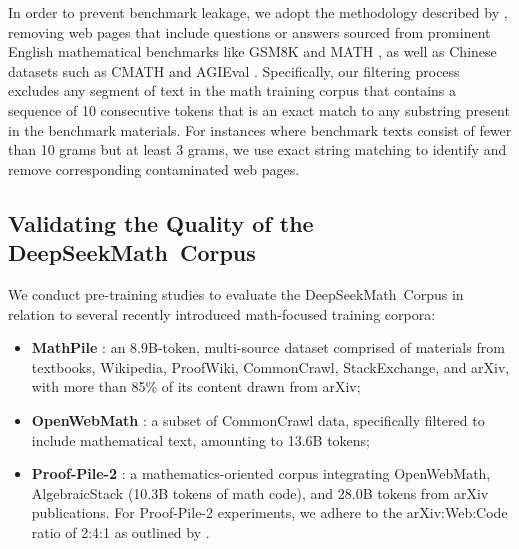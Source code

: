 In order to prevent benchmark leakage, we adopt the methodology described by \cite{deepseek-coder}, removing web pages that include questions or answers sourced from prominent English mathematical benchmarks like GSM8K \citep{gsm8k} and MATH \citep{MATH}, as well as Chinese datasets such as CMATH \citep{wei2023cmath} and AGIEval \citep{agieval}. Specifically, our filtering process excludes any segment of text in the math training corpus that contains a sequence of 10 consecutive tokens that is an exact match to any substring present in the benchmark materials. For instances where benchmark texts consist of fewer than 10 grams but at least 3 grams, we use exact string matching to identify and remove corresponding contaminated web pages.

\subsection{Validating the Quality of the DeepSeekMath~Corpus}

We conduct pre-training studies to evaluate the DeepSeekMath~Corpus in relation to several recently introduced math-focused training corpora:

\begin{itemize}[topsep=0pt]
    \item \textbf{MathPile} \citep{mathpile}: an 8.9B-token, multi-source dataset comprised of materials from textbooks, Wikipedia, ProofWiki, CommonCrawl, StackExchange, and arXiv, with more than 85\% of its content drawn from arXiv;
    \item \textbf{OpenWebMath} \citep{openwebmath}: a subset of CommonCrawl data, specifically filtered to include mathematical text, amounting to 13.6B tokens;
    \item \textbf{Proof-Pile-2} \citep{llemma}: a mathematics-oriented corpus integrating OpenWebMath, AlgebraicStack (10.3B tokens of math code), and 28.0B tokens from arXiv publications. For Proof-Pile-2 experiments, we adhere to the arXiv:Web:Code ratio of 2:4:1 as outlined by \cite{llemma}.
\end{itemize}

